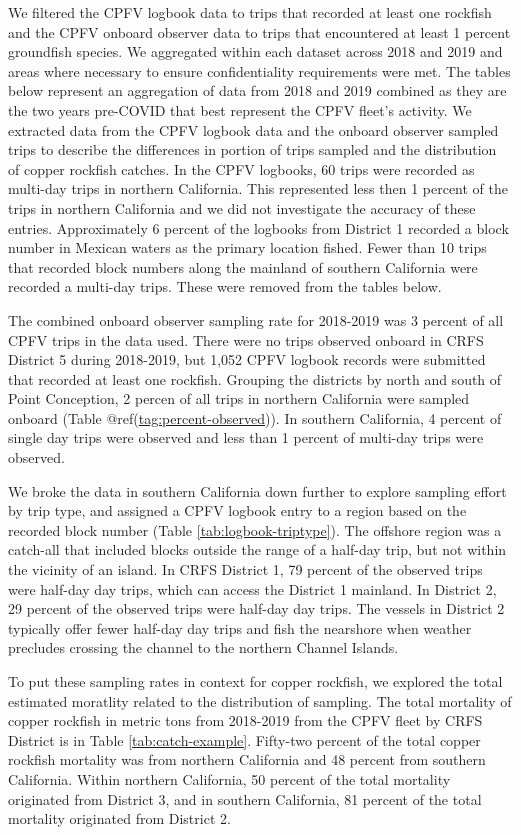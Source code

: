 \documentclass[11pt,
  english,
  letterpaper,
]{article}
\begin{document}
We filtered the CPFV logbook data to trips that recorded at least one rockfish and the CPFV onboard observer data to trips that encountered at least 1 percent groundfish species. We aggregated within each dataset across 2018 and 2019 and areas where necessary to ensure confidentiality requirements were met. The tables below represent an aggregation of data from 2018 and 2019 combined as they are the two years pre-COVID that best represent the CPFV fleet's activity. We extracted data from the CPFV logbook data and the onboard observer sampled trips to describe the differences in portion of trips sampled and the distribution of copper rockfish catches. In the CPFV logbooks, 60 trips were recorded as multi-day trips in northern California. This represented less then 1 percent of the trips in northern California and we did not investigate the accuracy of these entries. Approximately 6 percent of the logbooks from District 1 recorded a block number in Mexican waters as the primary location fished. Fewer than 10 trips that recorded block numbers along the mainland of southern California were recorded a multi-day trips. These were removed from the tables below.

The combined onboard observer sampling rate for 2018-2019 was 3 percent of all CPFV trips in the data used. There were no trips observed onboard in CRFS District 5 during 2018-2019, but 1,052 CPFV logbook records were submitted that recorded at least one rockfish. Grouping the districts by north and south of Point Conception, 2 percen of all trips in northern California were sampled onboard (Table @ref(\url{tag:percent-observed})). In southern California, 4 percent of single day trips were observed and less than 1 percent of multi-day trips were observed.

We broke the data in southern California down further to explore sampling effort by trip type, and assigned a CPFV logbook entry to a region based on the recorded block number (Table \ref{tab:logbook-triptype}). The offshore region was a catch-all that included blocks outside the range of a half-day trip, but not within the vicinity of an island. In CRFS District 1, 79 percent of the observed trips were half-day day trips, which can access the District 1 mainland. In District 2, 29 percent of the observed trips were half-day day trips. The vessels in District 2 typically offer fewer half-day day trips and fish the nearshore when weather precludes crossing the channel to the northern Channel Islands.

To put these sampling rates in context for copper rockfish, we explored the total estimated moratlity related to the distribution of sampling. The total mortality of copper rockfish in metric tons from 2018-2019 from the CPFV fleet by CRFS District is in Table \ref{tab:catch-example}. Fifty-two percent of the total copper rockfish mortality was from northern California and 48 percent from southern California. Within northern California, 50 percent of the total mortality originated from District 3, and in southern California, 81 percent of the total mortality originated from District 2.
\end{document}
